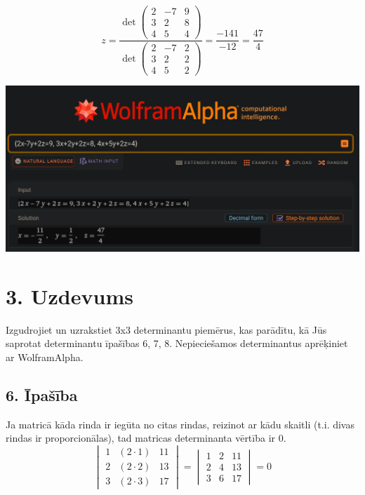\documentclass{article}
\begin{document}
\begin{equation*}
    z
    = 
    \frac
    {
        \det
        \begin{pmatrix}
            2 & -7 & 9\\
            3 & 2 & 8\\
            4 & 5 & 4
        \end{pmatrix}
    }
    {
        \det
        \begin{pmatrix}
            2 & -7 & 2\\
            3 & 2 & 2\\
            4 & 5 & 2
        \end{pmatrix}
    }
    =
    \frac{-141}{-12}
    =
    \frac{47}{4}
\end{equation*}

\includegraphics[width=\textwidth]{2}

\clearpage

\section*{3. Uzdevums}
Izgudrojiet un uzrakstiet 3x3 determinantu piemērus, kas parādītu, kā Jūs saprotat determinantu īpašības 6, 7, 8. Nepieciešamos determinantus aprēķiniet ar WolframAlpha.

\subsection*{6. Īpašība}
Ja matricā kāda rinda ir iegūta no citas rindas, reizinot ar kādu skaitli (t.i. divas rindas ir proporcionālas), tad matricas determinanta vērtība ir 0.
\begin{equation*}
    \begin{vmatrix}
        1 & (2 \cdot 1) & 11\\
        2 & (2 \cdot 2) & 13\\
        3 & (2 \cdot 3) & 17
    \end{vmatrix}
    =
    \begin{vmatrix}
        1 & 2 & 11\\
        2 & 4 & 13\\
        3 & 6 & 17
    \end{vmatrix}
    =
    0
\end{equation*}
\end{document}
